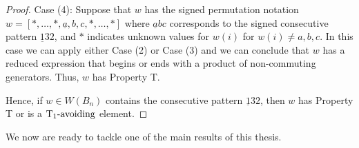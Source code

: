 \begin{lemma}
\begin{proof}
	Case (4): Suppose that $w$ has the signed permutation notation $w=[\ast, \ldots, \ast, \underline{a},b,c, \ast, \ldots, \ast]$ where $\underline{a}bc$ corresponds to the signed consecutive pattern $\underline{1}32$, and $\ast$ indicates unknown values for $w(i)$ for $w(i)\neq a,b,c$. In this case we can apply either Case (2) or Case (3) and we can conclude that $w$ has a reduced expression that begins or ends with a product of non-commuting generators. Thus, $w$ has Property T.
	
	Hence, if $w \in W(B_n)$ contains the consecutive pattern $\underline{1}32$, then $w$ has Property T or is a $\operatorname{T_1-\mathrm{avoiding}}$ element.
\end{proof}	
\end{lemma}

We now are ready to tackle one of the main results of this thesis.

